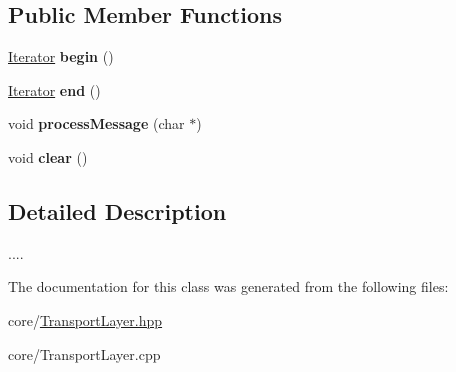 \subsection*{Public Member Functions}
\begin{DoxyCompactItemize}
\item 
\hyperlink{classTransportLayer_1_1Iterator}{Iterator} {\bfseries begin} ()\hypertarget{classTransportLayer_a635826c2399e9ff851bed57e6829948b}{}\label{classTransportLayer_a635826c2399e9ff851bed57e6829948b}

\item 
\hyperlink{classTransportLayer_1_1Iterator}{Iterator} {\bfseries end} ()\hypertarget{classTransportLayer_aba0bbf660b9a5f146ebccfa49d42809c}{}\label{classTransportLayer_aba0bbf660b9a5f146ebccfa49d42809c}

\item 
void {\bfseries process\+Message} (char $\ast$)\hypertarget{classTransportLayer_aa997123a0b253f07a66f73d9388111d6}{}\label{classTransportLayer_aa997123a0b253f07a66f73d9388111d6}

\item 
void {\bfseries clear} ()\hypertarget{classTransportLayer_a92828c3ac48c25dfdf166e9a0907285e}{}\label{classTransportLayer_a92828c3ac48c25dfdf166e9a0907285e}

\end{DoxyCompactItemize}


\subsection{Detailed Description}
.... 

The documentation for this class was generated from the following files\+:\begin{DoxyCompactItemize}
\item 
core/\hyperlink{TransportLayer_8hpp}{Transport\+Layer.\+hpp}\item 
core/Transport\+Layer.\+cpp\end{DoxyCompactItemize}
